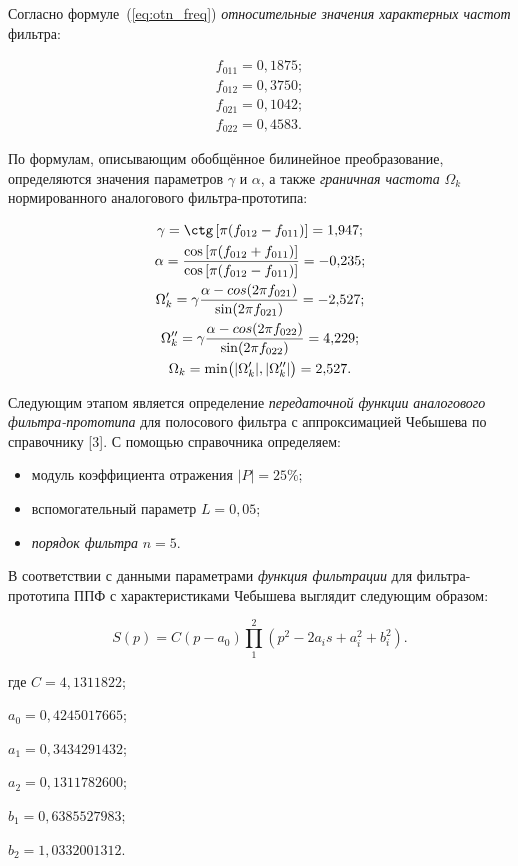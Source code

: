 \point Согласно формуле~(\ref{eq:otn_freq}) \textit{относительные значения
характерных частот} фильтра:

\begin{gather*}
  f_{011} = 0{,}1875;\\
  f_{012} = 0{,}3750;\\
  f_{021} = 0{,}1042;\\
  f_{022} = 0{,}4583.
\end{gather*}

\point По формулам, описывающим обобщённое билинейное преобразование,
определяются значения параметров $\gamma$ и $\alpha$, а также
\textit{граничная частота} $\Omega_k$ нормированного аналогового
фильтра-прототипа:

\begin{gather*}
  \gamma = \ctg \left[\pi (f_{012} - f_{011})\right] = 1{,}947;\\
  \alpha = \frac{\cos\left[\pi (f_{012} + f_{011})
    \right]}{\cos\left[\pi (f_{012} - f_{011}) \right]} = -0{,}235;\\
  \Omega'_k = \gamma \frac{\alpha - cos(2\pi f_{021})}{\sin(2\pi
    f_{021})} = -2{,}527;\\
  \Omega''_k = \gamma \frac{\alpha - cos(2\pi f_{022})}{\sin(2\pi
    f_{022})} = 4{,}229;\\
  \Omega_k = \text{min}\bigl(|\Omega'_k|,|\Omega''_k|\bigr) = 2{,}527.
\end{gather*}


\point Следующим этапом является определение \textit{передаточной
  функции} \emph{аналогового фильтра-прототипа} для полосового фильтра
с аппроксимацией Чебышева по справочнику [3]. С помощью справочника
определяем:

\begin{itemize}
\item модуль коэффициента отражения $|P| = 25\%$;
\item вспомогательный параметр $L = 0{,}05$;
\item \textit{порядок фильтра} $n = 5$.
\end{itemize}

В соответствии с данными параметрами \textit{функция фильтрации} для
фильтра-прототипа ППФ с характеристиками Чебышева выглядит следующим
образом:

\begin{equation*}
  S(p) = C(p-a_0)\prod_1^2(p^2-2a_is+a^2_i+b^2_i).
\end{equation*}

\begin{ESKDexplanation}
\item[где ] $C = 4{,}1311822$;
\item $a_0 = 0{,}4245017665$;
\item $a_1 = 0{,}3434291432$;
\item $a_2 = 0{,}1311782600$;
\item $b_1 = 0{,}6385527983$;
\item $b_2 = 1{,}0332001312$.
\end{ESKDexplanation}

